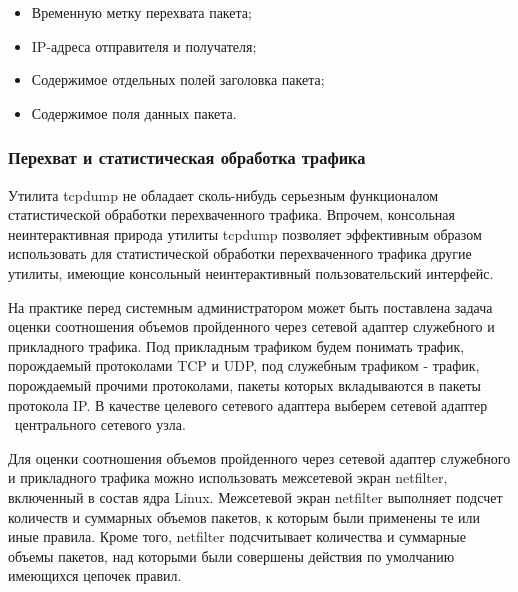 		\begin{itemize}
		
			\item Временную метку перехвата пакета;
			\item IP-адреса отправителя и получателя;
			\item Содержимое отдельных полей заголовка пакета;
			\item Содержимое поля данных пакета.

		\end{itemize}


\subsubsection{Перехват и статистическая обработка трафика}
\label{task:l4t3}

	Утилита tcpdump не обладает сколь-нибудь серьезным функционалом статистической обработки перехваченного трафика.
	Впрочем, консольная неинтерактивная	природа утилиты tcpdump позволяет эффективным образом использовать для
	статистической обработки перехваченного трафика другие утилиты, имеющие консольный неинтерактивный пользовательский
	интерфейс.

	На практике перед системным администратором может быть поставлена задача оценки соотношения объемов пройденного
	через сетевой адаптер служебного и прикладного трафика. Под прикладным трафиком будем понимать трафик, порождаемый
	протоколами TCP и UDP, под служебным трафиком - трафик, порождаемый прочими протоколами, пакеты которых вкладываются
	в пакеты протокола IP. В качестве целевого сетевого адаптера выберем сетевой адаптер \midethf\ центрального сетевого
	узла.

	Для оценки соотношения объемов пройденного через сетевой адаптер служебного и прикладного трафика можно
	использовать межсетевой экран netfilter, включенный в состав ядра Linux.
	Межсетевой экран netfilter выполняет подсчет количеств и суммарных объемов пакетов, к которым были применены
	те или иные правила. Кроме того, netfilter подсчитывает количества и суммарные объемы пакетов, над которыми были
	совершены действия по умолчанию имеющихся цепочек правил.

